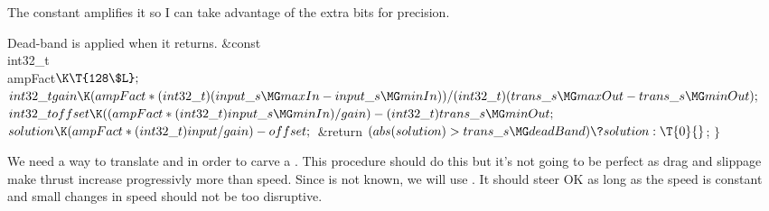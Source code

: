 The constant  amplifies it so I can take advantage of the
extra
bits for precision.

Dead-band is applied when it returns.
\Y\B\&{const} \\{int32\_t}\\{ampFact}${}\K\T{128\$L};{}$\7
${}\\{int32\_t}\\{gain}\K(\\{ampFact}*(\\{int32\_t})(\\{input\_s}\MG\\{maxIn}-%
\\{input\_s}\MG\\{minIn}))/(\\{int32\_t})(\\{trans\_s}\MG\\{maxOut}-\\{trans%
\_s}\MG\\{minOut});{}$\6
${}\\{int32\_t}\\{offset}\K((\\{ampFact}*(\\{int32\_t})\\{input\_s}\MG%
\\{minIn})/\\{gain})-(\\{int32\_t})\\{trans\_s}\MG\\{minOut};{}$\6
${}\\{solution}\K(\\{ampFact}*(\\{int32\_t})\\{input}/\\{gain})-\\{offset};{}$\6
\&{return} ${}(\\{abs}(\\{solution})>\\{trans\_s}\MG\\{deadBand})\?%
\\{solution}:\T{0}{}$;\7
$\}{}$\Y\par
\fi

We need a way to translate  and  in order to
carve a
. This procedure should do this but it's not going to be perfect
as
drag and slippage make thrust increase progressivly more than speed.
Since  is not known, we will use .
It should steer OK as long as the speed is constant and small changes in speed
should not be too disruptive.

